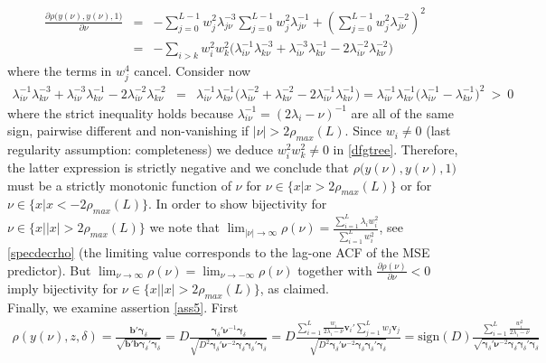 \documentclass[a4paper]{article}
\begin{document}
\begin{eqnarray}
\frac{\partial\rho\Big(y(\nu),y(\nu),1\Big)}{\partial\nu}&=&-\sum_{j=0}^{L-1}w_j^2\lambda_{j\nu}^{-3}\sum_{j=0}^{L-1}w_j^2\lambda_{j\nu}^{-1}+\left(\sum_{j=0}^{L-1}w_j^2\lambda_{j\nu}^{-2}\right)^2\nonumber\\
&=&-\sum_{i> k}w_i^2w_k^2 \Big(\lambda_{i\nu}^{-1}\lambda_{k\nu}^{-3}+\lambda_{i\nu}^{-3}\lambda_{k\nu}^{-1}-2\lambda_{i\nu}^{-2}\lambda_{k\nu}^{-2}\Big)\label{dfgtree}
\end{eqnarray}
where the terms in $w_j^4$ cancel. Consider now
\begin{eqnarray}\lambda_{i\nu}^{-1}\lambda_{k\nu}^{-3}+\lambda_{i\nu}^{-3}\lambda_{k\nu}^{-1}-2\lambda_{i\nu}^{-2}\lambda_{k\nu}^{-2}&=&\lambda_{i\nu}^{-1}\lambda_{k\nu}^{-1}\Big(\lambda_{i\nu}^{-2}+\lambda_{k\nu}^{-2}-2\lambda_{i\nu}^{-1}\lambda_{k\nu}^{-1}\Big)=\lambda_{i\nu}^{-1}\lambda_{k\nu}^{-1}\Big(\lambda_{i\nu}^{-1}-\lambda_{k\nu}^{-1}\Big)^{2}~>~0\nonumber
\end{eqnarray}
where the strict inequality holds because $\lambda_{i\nu}^{-1}=(2\lambda_i-\nu)^{-1}$ are all of the same sign, pairwise different and non-vanishing if $|\nu|>2\rho_{max}(L)$. Since  $w_i\neq 0$ (last regularity assumption: completeness) we deduce $w_i^2w_k^2\neq 0$ in \ref{dfgtree}. Therefore, the latter expression is strictly negative and we conclude that $\rho\Big(y(\nu),y(\nu),1\Big)$ must be a strictly monotonic function of $\nu$ for $\nu\in\{x|x>2\rho_{max}(L)\}$ or for $\nu\in\{x|x<-2\rho_{max}(L)\}$. In order to show bijectivity for $\nu\in\{x||x|>2\rho_{max}(L)\}$ we note that $\lim_{|\nu|\to\infty}\rho(\nu)=\frac{\sum_{i=1}^L \lambda_{i }w_i^2}{\sum_{i=1}^L w_i^2}$, see \ref{specdecrho} (the limiting value corresponds to the lag-one ACF of the MSE predictor). But $\lim_{\nu\to\infty}\rho(\nu)=\lim_{\nu\to-\infty}\rho(\nu)$ together with $\frac{\partial\rho(\nu)}{\partial\nu}<0$ imply bijectivity for $\nu\in\{x||x|>2\rho_{max}(L)\}$, as claimed.\\
Finally, we examine assertion \ref{ass5}. %
First
\begin{eqnarray*}
\rho(y(\nu),z,\delta)=\frac{\mathbf{b}'\boldsymbol{\gamma}_{\delta}}{\sqrt{\mathbf{b}'\mathbf{b}\boldsymbol{\gamma}_{\delta}'\boldsymbol{\gamma}_{\delta}}}=D\frac{\boldsymbol{\gamma}_{\delta}'\boldsymbol{\nu}^{-1}\boldsymbol{\gamma}_{\delta}}{\sqrt{D^2\boldsymbol{\gamma}_{\delta}'\boldsymbol{\nu}^{-2}\boldsymbol{\gamma}_{\delta}\boldsymbol{\gamma}_{\delta}'\boldsymbol{\gamma}_{\delta}}}=
D\frac{\sum_{i=1}^L \frac{w_i}{2\lambda_{i}-\nu}\mathbf{v}_{i}'\sum_{j=1}^L w_j\mathbf{v}_{j}}{\sqrt{D^2\boldsymbol{\gamma}_{\delta}'\boldsymbol{\nu}^{-2}\boldsymbol{\gamma}_{\delta}\boldsymbol{\gamma}_{\delta}'\boldsymbol{\gamma}_{\delta}}}=\textrm{sign}(D)\frac{\sum_{i=1}^L \frac{w_i^2}{2\lambda_{i}-\nu}}{\sqrt{\boldsymbol{\gamma}_{\delta}'\boldsymbol{\nu}^{-2}\boldsymbol{\gamma}_{\delta}\boldsymbol{\gamma}_{\delta}'\boldsymbol{\gamma}_{\delta}}}
\end{eqnarray*}
\end{document}
